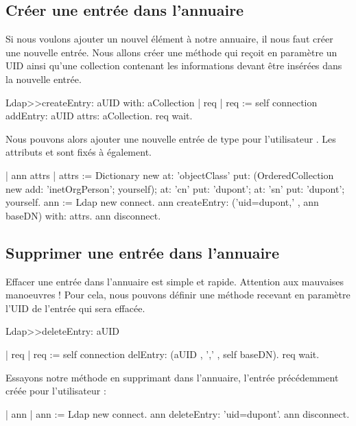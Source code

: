 \documentclass[a4paper,10pt,twoside]{book}
\begin{document}
\subsection{Cr\'eer une entr\'ee dans l'annuaire}

Si nous voulons ajouter un nouvel \'el\'ement \`a notre annuaire, il nous faut cr\'eer une nouvelle entr\'ee. Nous allons cr\'eer une m\'ethode  qui re\c coit en param\`etre un UID ainsi qu'une collection contenant les informations devant \^etre ins\'er\'ees dans la nouvelle entr\'ee.

\begin{code}{}
Ldap>>createEntry: aUID with: aCollection 
	| req |
	req := self connection addEntry: aUID attrs: aCollection. 
	req wait.
\end{code}

Nous pouvons alors ajouter une nouvelle entr\'ee de type  pour l'utilisateur . Les attributs  et  sont fix\'es \`a  \'egalement. 

\begin{code}{}
	| ann attrs |
	attrs := Dictionary new 
				at: 'objectClass' 
				put: (OrderedCollection new add: 'inetOrgPerson'; yourself); 
				at: 'cn' put: 'dupont'; 
				at: 'sn' put: 'dupont'; yourself.
	ann := Ldap new connect. 
	ann createEntry: ('uid=dupont,' , ann baseDN) with: attrs.
	ann disconnect.
\end{code}

\subsection{Supprimer une entr\'ee dans l'annuaire}
Effacer une entr\'ee dans l'annuaire est simple et rapide. Attention aux mauvaises manoeuvres ! 
Pour cela, nous pouvons d\'efinir une m\'ethode  recevant en param\`etre l'UID de l'entr\'ee qui sera effac\'ee.

\begin{code}{}
Ldap>>deleteEntry: aUID 

	| req | 
	req := self connection delEntry: (aUID , ',' , self baseDN). 
	req wait.
\end{code}

Essayons notre m\'ethode en supprimant dans l'annuaire, l'entr\'ee pr\'ec\'edemment cr\'e\'ee pour l'utilisateur  :

\begin{code}{}
| ann |
ann := Ldap new connect. 
ann deleteEntry: 'uid=dupont'. 
ann disconnect.
\end{code}
\end{document}
